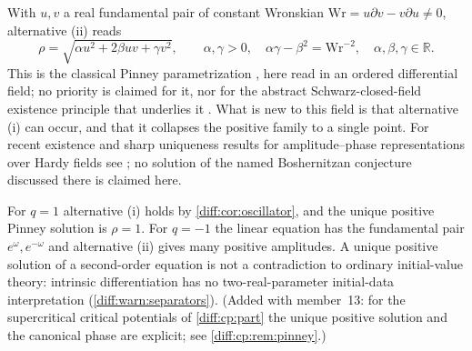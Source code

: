 \documentclass[11pt,letterpaper]{article}
\numberwithin{equation}{section}
\theoremstyle{definition}
\theoremstyle{remark}
\newcommand{\R}{\mathbb R}
\newcommand{\der}{\partial}
\begin{document}
With $u,v$ a real fundamental pair of constant Wronskian
$\mathrm{Wr}=u\der v-v\der u\neq0$, alternative (ii) reads
\begin{equation}\label{diff:eq:matpinneyclassical}
 \rho=\sqrt{\alpha u^{2}+2\beta uv+\gamma v^{2}},
 \qquad
 \alpha,\gamma>0,\quad \alpha\gamma-\beta^{2}=\mathrm{Wr}^{-2},
 \quad \alpha,\beta,\gamma\in\R .
\end{equation}
This is the classical Pinney parametrization \cite{Pinney}, here read in an
ordered differential field; no priority is claimed for it, nor for the
abstract Schwarz-closed-field existence principle that underlies it
\cite{ADHNorm}. What is new to this field is that alternative (i) can occur,
and that it collapses the positive family to a single point. For recent
existence and sharp uniqueness results for amplitude--phase representations
over Hardy fields see \cite{ADHSecond}; no solution of the named Boshernitzan
conjecture discussed there is claimed here.

For $q=1$ alternative (i) holds by \cref{diff:cor:oscillator}, and the unique
positive Pinney solution is $\rho=1$. For $q=-1$ the linear equation has the
fundamental pair $e^{\omega},e^{-\omega}$ and alternative (ii) gives many
positive amplitudes. A unique positive solution of a second-order equation is
not a contradiction to ordinary initial-value theory: intrinsic differentiation
has no two-real-parameter initial-data interpretation
(\cref{diff:warn:separators}). (Added with member~13: for the supercritical
critical potentials of \cref{diff:cp:part} the unique positive solution and the
canonical phase are explicit; see \cref{diff:cp:rem:pinney}.)
\end{document}
